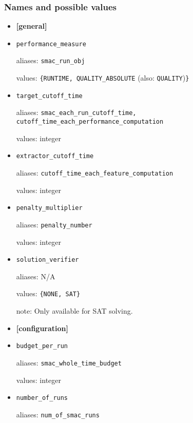 \documentclass{article}
\begin{document}
\subsubsection{Names and possible values}
\label{sect:settings_details}
\begin{itemize}[noitemsep]
  \item[] \textbf{[general]}\\
  \item[] \texttt{performance\_measure}

          aliases: \texttt{smac\_run\_obj}

          values: \texttt{\{RUNTIME, QUALITY\_ABSOLUTE} (also: \texttt{QUALITY})\texttt{\}}\\
  \item[] \texttt{target\_cutoff\_time}

          aliases: \texttt{smac\_each\_run\_cutoff\_time, cutoff\_time\_each\_performance\_computation}

          values: integer\\
  \item[] \texttt{extractor\_cutoff\_time}

          aliases: \texttt{cutoff\_time\_each\_feature\_computation}

          values: integer\\
  \item[] \texttt{penalty\_multiplier}

          aliases: \texttt{penalty\_number}

          values: integer\\
  \item[] \texttt{solution\_verifier}

          aliases: N/A

          values: \texttt{\{NONE, SAT\}}

          note: Only available for SAT solving.\\
  \item[] \textbf{[configuration]}\\
  \item[] \texttt{budget\_per\_run}

          aliases: \texttt{smac\_whole\_time\_budget}

          values: integer\\
  \item[] \texttt{number\_of\_runs}

          aliases: \texttt{num\_of\_smac\_runs}


\end{itemize}
\end{document}
